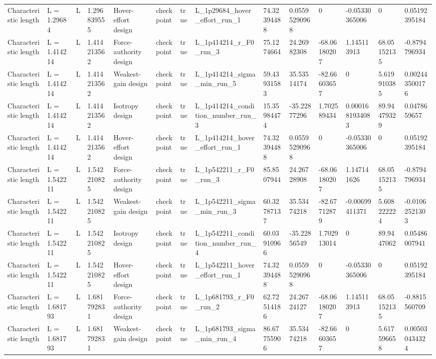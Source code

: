 \begin{tabular}{@{}llllllllllllll@{}}
Characteristic length & L = 1.29684 & L & 1.296839555 & Hover-effort design & checkpoint & true & L\_1p29684\_hover\_effort\_run\_1 & 74.32394488 & 0.05595290968 & 0 & -0.05330365006 & 0 & 0.05192395184 \\
Characteristic length & L = 1.414214 & L & 1.414213562 & Force-authority design & checkpoint & true & L\_1p414214\_r\_F0\_run\_3 & 75.1274664 & 24.26982308 & -68.06180207 & 1.145113913 & 68.05152135 & -0.8794796934 \\
Characteristic length & L = 1.414214 & L & 1.414213562 & Weakest-gain design & checkpoint & true & L\_1p414214\_sigma\_min\_run\_5 & 59.43931583 & 35.53514174 & -82.66603657 & 0 & 5.619910385 & 0.002443500176 \\
Characteristic length & L = 1.414214 & L & 1.414213562 & Isotropy design & checkpoint & true & L\_1p414214\_condition\_number\_run\_3 & 15.35984474 & -35.22877296 & 1.702589434 & 0.0001681934083 & 89.94479329 & 0.0478659657 \\
Characteristic length & L = 1.414214 & L & 1.414213562 & Hover-effort design & checkpoint & true & L\_1p414214\_hover\_effort\_run\_1 & 74.32394488 & 0.05595290968 & 0 & -0.05330365006 & 0 & 0.05192395184 \\
Characteristic length & L = 1.542211 & L & 1.542210825 & Force-authority design & checkpoint & true & L\_1p542211\_r\_F0\_run\_3 & 85.8507944 & 24.26728908 & -68.06180207 & 1.147141626 & 68.05152135 & -0.8794796934 \\
Characteristic length & L = 1.542211 & L & 1.542210825 & Weakest-gain design & checkpoint & true & L\_1p542211\_sigma\_min\_run\_3 & 60.32787137 & 35.53474218 & -82.67712879 & -0.00699411371 & 5.608222224 & -0.01062521303 \\
Characteristic length & L = 1.542211 & L & 1.542210825 & Isotropy design & checkpoint & true & L\_1p542211\_condition\_number\_run\_4 & 60.03910966 & -35.22856549 & 1.702913014 & 0 & 89.9447062 & 0.05486007941 \\
Characteristic length & L = 1.542211 & L & 1.542210825 & Hover-effort design & checkpoint & true & L\_1p542211\_hover\_effort\_run\_1 & 74.32394488 & 0.05595290968 & 0 & -0.05330365006 & 0 & 0.05192395184 \\
Characteristic length & L = 1.681793 & L & 1.681792831 & Force-authority design & checkpoint & true & L\_1p681793\_r\_F0\_run\_2 & 62.72514186 & 24.26724127 & -68.06180207 & 1.145113913 & 68.05152135 & -0.8815560709 \\
Characteristic length & L = 1.681793 & L & 1.681792831 & Weakest-gain design & checkpoint & true & L\_1p681793\_sigma\_min\_run\_4 & 86.67755906 & 35.53474218 & -82.66603657 & 0 & 5.617596658 & 0.005030434324 \\

\end{tabular}

